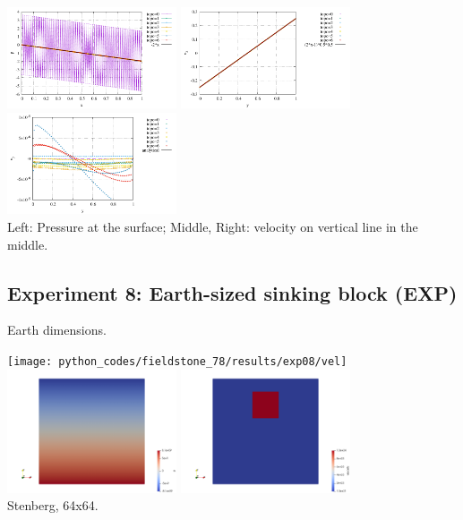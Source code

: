 \begin{center}
\includegraphics[width=5cm]{python_codes/fieldstone_78/results/pressure_top_exp7.pdf}
\includegraphics[width=5cm]{python_codes/fieldstone_78/results/vx_profile_exp7.pdf}
\includegraphics[width=5cm]{python_codes/fieldstone_78/results/vy_profile_exp7.pdf}\\
{\captionfont Left: Pressure at the surface; Middle, Right: velocity on vertical line in the middle.}
\end{center}




\newpage
\subsection*{Experiment 8: Earth-sized sinking block (EXP)}

Earth dimensions. 

\begin{center}
\texttt{[image: python\_codes/fieldstone\_78/results/exp08/vel]}
\includegraphics[width=5cm]{python_codes/fieldstone_78/results/exp08/p}
\includegraphics[width=5cm]{python_codes/fieldstone_78/results/exp08/eta}\\
{\captionfont Stenberg, 64x64.}
\end{center}


